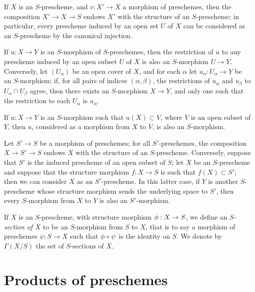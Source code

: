 \begin{env}[2.5.3]
\label{env-1.2.5.3}
If $X$ is an $S$-prescheme, and $v:X'\to X$ a morphism of preschemes,
then the composition $X'\to X\to S$ endows $X'$ with the structure of an $S$-prescheme;
in particular, every prescheme induced by an open set $U$ of $X$ can be considered as an
$S$-prescheme by the canonical injection.

If $u:X\to Y$ is an $S$-morphism of $S$-preschemes, then the restriction
of $u$ to any prescheme induced by an open subset $U$ of $X$ is also an
$S$-morphism $U\to Y$. Conversely, let $(U_\alpha)$ be an open cover of $X$,
and for each $\alpha$ let $u_\alpha:U_\alpha\to Y$ be an $S$-morphism; if,
for all pairs of indices $(\alpha,\beta)$, the restrictions of $u_\alpha$ and
$u_\beta$ to $U_\alpha\cap U_\beta$ agree, then there exists an $S$-morphism
$X\to Y$, and only one such that the restriction to each $U_\alpha$ is
$u_\alpha$.

If $u:X\to Y$ is an $S$-morphism such that $u(X)\subset V$, where $V$ is
an open subset of $Y$, then $u$, considered as a morphism from $X$ to $V$, is
also an $S$-morphism.
\end{env}

\begin{env}[2.5.4]
\label{env-1.2.5.4}
Let $S'\to S$ be a morphism of preschemes; for all
$S'$-preschemes, the composition $X\to S'\to S$ endows $X$ with the structure of
an $S$-prescheme. Conversely, suppose that $S'$ is the induced prescheme of an
open subset of $S$; let $X$ be an $S$-prescheme and suppose that the structure
morphism $f:X\to S$ is such that $f(X)\subset S'$; then we can consider
$X$ as an $S'$-prescheme. In this latter case, if $Y$ is another $S$-prescheme
whose structure morphism sends the underlying space to $S'$, then every
$S$-morphism from $X$ to $Y$ is also an $S'$-morphism.
\end{env}

\begin{env}[2.5.5]
\label{env-1.2.5.5}
If $X$ is an $S$-prescheme, with structure morphism
$\phi:X\to S$, we define an {\it $S$-section of $X$} to be an
$S$-morphism from $S$ to $X$, that is to say a morphism of preschemes
$\psi:S\to X$ such that $\phi\circ\psi$ is the identity on $S$. We
denote by $\Gamma(X/S)$ the set of $S$-sections of $X$.
\end{env}

\section{Products of preschemes}
\label{section-products-of-preschemes}

